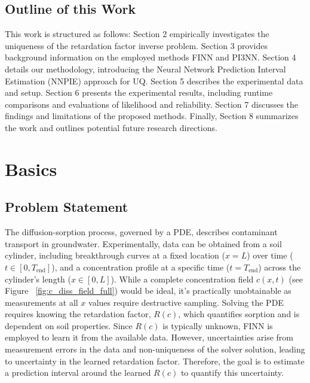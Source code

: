 \subsection{Outline of this Work}
This work is structured as follows: Section 2 empirically investigates the uniqueness of the retardation factor inverse problem. Section 3 provides background information on the employed methods FINN and PI3NN. Section 4 details our methodology, introducing the Neural Network Prediction Interval Estimation (NNPIE) approach for UQ. Section 5 describes the experimental data and setup. Section 6 presents the experimental results, including runtime comparisons and evaluations of likelihood and reliability. Section 7 discusses the findings and limitations of the proposed methods. Finally, Section 8 summarizes the work and outlines potential future research directions.



\section{Basics}

\subsection{Problem Statement}
The diffusion-sorption process, governed by a PDE, describes contaminant transport in groundwater. Experimentally, data can be obtained from a soil cylinder, including breakthrough curves at a fixed location ($x=L$) over time ($t \in [0, T_{\text{end}}]$), and a concentration profile at a specific time ($t=T_{\text{end}}$) across the cylinder's length ($x \in [0,L]$). While a complete concentration field $c(x,t)$ (see Figure ~\vref{fig:c_diss_field_full}) would be ideal, it's practically unobtainable as measurements at all $x$ values require destructive sampling. Solving the PDE requires knowing the retardation factor, $R(c)$, which quantifies sorption and is dependent on soil properties. Since $R(c)$ is typically unknown, FINN is employed to learn it from the available data. However, uncertainties arise from measurement errors in the data and non-uniqueness of the solver solution, leading to uncertainty in the learned retardation factor. Therefore, the goal is to estimate a prediction interval around the learned $R(c)$ to quantify this uncertainty.


